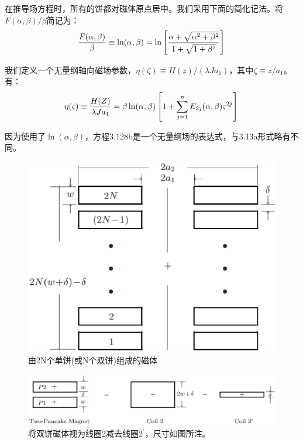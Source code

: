 在推导场方程时，所有的饼都对磁体原点居中。我们采用下面的简化记法。将$F(\alpha,\beta)/{\beta}$简记为：
\begin{equation}
\frac{F(\alpha,\beta)}{\beta}\equiv \ln(\alpha,\beta)=\ln\left[\frac{\alpha+\sqrt{\alpha^2+\beta^2}}{1+\sqrt{1+\beta^2}}\right]\\%
\end{equation}

我们定义一个无量纲轴向磁场参数，$\eta(\zeta)\equiv H(z)/(\lambda J a_1)$，其中$\zeta\equiv z/a_1$。有：
\begin{equation}
\eta(\varsigma)\equiv \frac{H(Z)}{\lambda Ja_{1}}=\beta \ln(\alpha,\beta)\left[1+\sum_{j=1}^{n} E_{2j}(\alpha,\beta)\varsigma^{2j}\right]\\%
\end{equation}

因为使用了$\ln(\alpha,\beta)$，方程3.128b是一个无量纲场的表达式，与3.13a形式略有不同。
\begin{figure}[htbp]
	\centering
	\includegraphics[scale=0.4]{chpt3/figs/fig3.28.eps}
	\caption{由2N个单饼(或N个双饼)组成的磁体}
\end{figure}

\begin{figure}[htbp]
	\centering
	\includegraphics[scale=0.5]{chpt3/figs/fig3.29.eps}
	\caption{将双饼磁体视为线圈2减去线圈$2^\prime$，尺寸如图所注。}
\end{figure}

